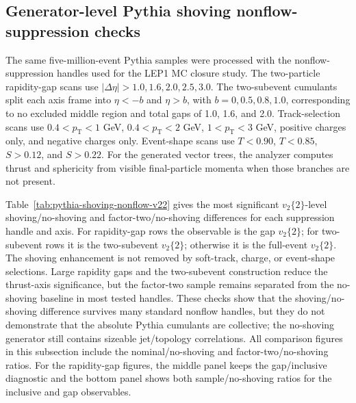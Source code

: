 \documentclass{article}
\newcommand{\pT}{\ensuremath{p_{\mathrm{T}}}}
\newcommand{\vn}[2]{\ensuremath{v_{#1}\{#2\}}}
\begin{document}
\subsection{Generator-level Pythia shoving nonflow-suppression checks}
\label{subsec:pythia-shoving-nonflow}

The same five-million-event Pythia samples were processed with the
nonflow-suppression handles used for the LEP1 MC closure study. The two-particle
rapidity-gap scans use \(|\Delta\eta|>1.0,1.6,2.0,2.5,3.0\). The two-subevent
cumulants split each axis frame into \(\eta<-b\) and \(\eta>b\), with
\(b=0,0.5,0.8,1.0\), corresponding to no excluded middle region and total gaps
of 1.0, 1.6, and 2.0. Track-selection scans use \(0.4<\pT<1\) GeV,
\(0.4<\pT<2\) GeV, \(1<\pT<3\) GeV, positive charges only, and negative charges
only. Event-shape scans use \(T<0.90\), \(T<0.85\), \(S>0.12\), and \(S>0.22\).
For the generated vector trees, the analyzer computes thrust and sphericity from
visible final-particle momenta when those branches are not present.

Table~\ref{tab:pythia-shoving-nonflow-v22} gives the most significant
\(\vn{2}{2}\)-level shoving/no-shoving and factor-two/no-shoving differences for
each suppression handle and axis. For rapidity-gap rows the observable is the
gap \(\vn{2}{2}\); for two-subevent rows it is the two-subevent \(\vn{2}{2}\);
otherwise it is the full-event \(\vn{2}{2}\). The shoving enhancement is not
removed by soft-track, charge, or event-shape selections. Large rapidity gaps and
the two-subevent construction reduce the thrust-axis significance, but the
factor-two sample remains separated from the no-shoving baseline in most tested
handles. These checks show that the shoving/no-shoving difference survives many
standard nonflow handles, but they do not demonstrate that the absolute Pythia
cumulants are collective; the no-shoving generator still contains sizeable
jet/topology correlations. All comparison figures in this subsection include the
nominal/no-shoving and factor-two/no-shoving ratios. For the rapidity-gap
figures, the middle panel keeps the gap/inclusive diagnostic and the bottom panel
shows both sample/no-shoving ratios for the inclusive and gap observables.
\end{document}
